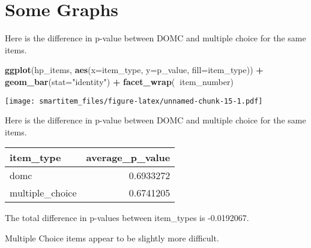 \documentclass[]{book}
\newenvironment{Shaded}{\begin{snugshade}}{\end{snugshade}}
\newcommand{\KeywordTok}[1]{\textcolor[rgb]{0.13,0.29,0.53}{\textbf{#1}}}
\newcommand{\DataTypeTok}[1]{\textcolor[rgb]{0.13,0.29,0.53}{#1}}
\newcommand{\StringTok}[1]{\textcolor[rgb]{0.31,0.60,0.02}{#1}}
\newcommand{\OtherTok}[1]{\textcolor[rgb]{0.56,0.35,0.01}{#1}}
\newcommand{\OperatorTok}[1]{\textcolor[rgb]{0.81,0.36,0.00}{\textbf{#1}}}
\newcommand{\NormalTok}[1]{#1}
\theoremstyle{definition}
\theoremstyle{definition}
\theoremstyle{definition}
\theoremstyle{remark}
\begin{document}
\section{Some Graphs}\label{some-graphs}

Here is the difference in p-value between DOMC and multiple choice for
the same items.

\begin{Shaded}
\begin{Highlighting}[]
\KeywordTok{ggplot}\NormalTok{(hp_items, }\KeywordTok{aes}\NormalTok{(}\DataTypeTok{x=}\NormalTok{item_type, }\DataTypeTok{y=}\NormalTok{p_value, }\DataTypeTok{fill=}\NormalTok{item_type)) }\OperatorTok{+}\StringTok{ }\KeywordTok{geom_bar}\NormalTok{(}\DataTypeTok{stat=}\StringTok{"identity"}\NormalTok{)  }\OperatorTok{+}\StringTok{ }\KeywordTok{facet_wrap}\NormalTok{(}\OperatorTok{~}\NormalTok{item_number)}
\end{Highlighting}
\end{Shaded}

\texttt{[image: smartitem\_files/figure-latex/unnamed-chunk-15-1.pdf]}

Here is the difference in p-value between DOMC and multiple choice for
the same items.

\begin{Shaded}
\end{Shaded}

\begin{tabular}{l|r}
\hline
item\_type & average\_p\_value\\
\hline
domc & 0.6933272\\
\hline
multiple\_choice & 0.6741205\\
\hline
\end{tabular}

The total difference in p-values between item\_types is -0.0192067.

Multiple Choice items appear to be slightly more difficult.


\end{document}
